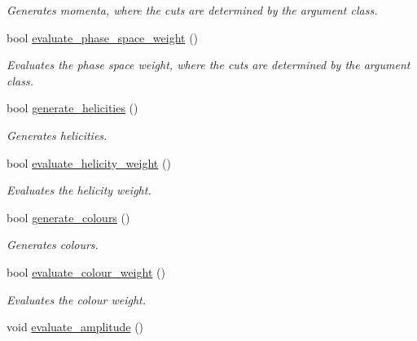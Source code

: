 \begin{DoxyCompactItemize}
\begin{DoxyCompactList}\small\item\em Generates momenta, where the cuts are determined by the argument class. \end{DoxyCompactList}\item 
bool \hyperlink{a00430_a394dbe0bd27ced566ea1728a5fda64b6}{evaluate\-\_\-phase\-\_\-space\-\_\-weight} ()
\begin{DoxyCompactList}\small\item\em Evaluates the phase space weight, where the cuts are determined by the argument class. \end{DoxyCompactList}\item 
\hypertarget{a00430_a5682990085a2cb028d5f3b1369e2761c}{bool \hyperlink{a00430_a5682990085a2cb028d5f3b1369e2761c}{generate\-\_\-helicities} ()}\label{a00430_a5682990085a2cb028d5f3b1369e2761c}

\begin{DoxyCompactList}\small\item\em Generates helicities. \end{DoxyCompactList}\item 
\hypertarget{a00430_a378751f56ee46c3a268b7a7c6da1481f}{bool \hyperlink{a00430_a378751f56ee46c3a268b7a7c6da1481f}{evaluate\-\_\-helicity\-\_\-weight} ()}\label{a00430_a378751f56ee46c3a268b7a7c6da1481f}

\begin{DoxyCompactList}\small\item\em Evaluates the helicity weight. \end{DoxyCompactList}\item 
\hypertarget{a00430_a15bab9146b168baa970367df22a435d3}{bool \hyperlink{a00430_a15bab9146b168baa970367df22a435d3}{generate\-\_\-colours} ()}\label{a00430_a15bab9146b168baa970367df22a435d3}

\begin{DoxyCompactList}\small\item\em Generates colours. \end{DoxyCompactList}\item 
\hypertarget{a00430_ac3ea54ae2ecadc28d34074dff354db2b}{bool \hyperlink{a00430_ac3ea54ae2ecadc28d34074dff354db2b}{evaluate\-\_\-colour\-\_\-weight} ()}\label{a00430_ac3ea54ae2ecadc28d34074dff354db2b}

\begin{DoxyCompactList}\small\item\em Evaluates the colour weight. \end{DoxyCompactList}\item 
\hypertarget{a00430_ad4abb467c413001ed3b65063a84660de}{void \hyperlink{a00430_ad4abb467c413001ed3b65063a84660de}{evaluate\-\_\-amplitude} ()}\label{a00430_ad4abb467c413001ed3b65063a84660de}


\end{DoxyCompactItemize}
